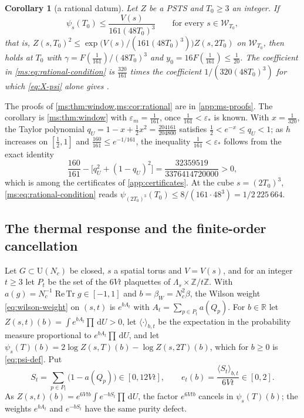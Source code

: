 \documentclass[11pt,a4paper]{amsart}
\newtheorem{corollary}[theorem]{Corollary}
\theoremstyle{definition}
\theoremstyle{remark}
\numberwithin{equation}{section}
\DeclareMathOperator{\ReTr}{Re\,Tr}  %
\newcommand{\R}{\mathbb{R}}          %
\newcommand{\Z}{\mathbb{Z}}          %
\newcommand{\Wwin}{\mathcal{W}}      %
\newcommand{\dd}{\,\mathrm{d}}             %
\newcommand{\U}{\mathrm{U}}                %
\newcommand{\PSTS}{\textup{PSTS}}          %
\newcommand{\Zpart}[2]{Z(#1,#2)}           %
\newcommand{\psiT}[2]{\psi_{#1}(#2)}       %
\newcommand{\Vol}[1]{V(#1)}                %
\newcommand{\cube}[1]{(2#1)^3}             %
\newcommand{\Bstar}{\text{\upshape(B$^{*}$)}}       %
\newcommand{\betaW}{\beta_{W}}             %
\begin{document}
\begin{corollary}[a rational datum]\label{ms:cor:rational}
Let $Z$ be a \PSTS{} and $T_0\ge3$ an integer. If
\begin{equation}\label{ms:eq:rational-condition}
\psiT{s}{T_0}\le\frac{\Vol{s}}{161(48T_0)^3}\qquad\text{for every }s\in\Wwin_{T_0},
\end{equation}
that is, $\Zpart{s}{T_0}^2\le\exp\bigl(\Vol{s}/(161(48T_0)^3)\bigr)\Zpart{s}{2T_0}$ on $\Wwin_{T_0}$, then \Bstar{} holds at $T_0$ with $\gamma=F(\frac1{161})/(48T_0)^3$ and $y_0=16F(\frac1{161})\le\frac1{20}$. The coefficient in \eqref{ms:eq:rational-condition} is $\frac{320}{161}$ times the coefficient $1/(320(48T_0)^3)$ for which \eqref{eq:X-psi} alone gives \Bstar{}.
\end{corollary}

The proofs of \cref{ms:thm:window,ms:cor:rational} are in \cref{app:ms-proofs}. The corollary is \cref{ms:thm:window} with $\varepsilon_m=\frac1{161}$, once $\frac1{161}<\varepsilon_*$ is known. With $x=\frac1{320}$, the Taylor polynomial $q_U=1-x+\frac12x^2=\frac{204161}{204800}$ satisfies $\frac12<e^{-x}\le q_U<1$; as $h$ increases on $[\frac12,1]$ and $\frac{160}{161}\le e^{-1/161}$, the inequality $\frac1{161}<\varepsilon_*$ follows from the exact identity
\begin{equation}\label{ms:eq:rational-margin}
\frac{160}{161}-\bigl[q_U^2+(1-q_U)^2\bigr]=\frac{32359519}{3376414720000}>0 ,
\end{equation}
which is among the certificates of \cref{app:certificates}. At the cube $s=\cube{T_0}$, \eqref{ms:eq:rational-condition} reads $\psiT{\cube{T_0}}{T_0}\le8/(161\cdot48^3)=1/2\,225\,664$.

\subsection{The thermal response and the finite-order cancellation}

Let $G\subset\U(N_c)$ be closed, $s$ a spatial torus and $V=\Vol{s}$, and for an integer $t\ge3$ let $P_t$ be the set of the $6Vt$ plaquettes of $\Lambda_s\times\Z/t\Z$. With $a(g)=N_c^{-1}\ReTr g\in[-1,1]$ and $b=\betaW=N_c^2\beta$, the Wilson weight \eqref{eq:wilson-weight} on $(s,t)$ is $e^{bA_t}$ with $A_t=\sum_{p\in P_t}a(Q_p)$. For $b\in\R$ let $\Zpart{s}{t}(b)=\int e^{bA_t}\prod\dd U>0$, let $\langle\cdot\rangle_{b,t}$ be the expectation in the probability measure proportional to $e^{bA_t}\prod\dd U$, and let $\psiT{s}{T}(b)=2\log\Zpart{s}{T}(b)-\log\Zpart{s}{2T}(b)$, which for $b\ge0$ is \eqref{eq:psi-def}. Put
\[
S_t=\sum_{p\in P_t}\bigl(1-a(Q_p)\bigr)\in[0,12Vt],\qquad e_t(b)=\frac{\langle S_t\rangle_{b,t}}{6Vt}\in[0,2].
\]
As $\Zpart{s}{t}(b)=e^{6Vtb}\int e^{-bS_t}\prod\dd U$, the factor $e^{6Vtb}$ cancels in $\psiT{s}{T}(b)$; the weights $e^{bA_t}$ and $e^{-bS_t}$ have the same purity defect.
\end{document}
